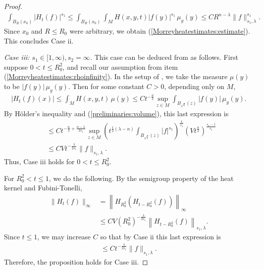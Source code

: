 \documentclass[12pt]{amsart}
\renewcommand{\1}{{\mathbf 1}}
\theoremstyle{others}
\numberwithin{equation}{section}
\begin{document}
\begin{proof}
		\begin{align*}
		\int_{B_R(x_0)} |H_t(f)|^{s_1} \leq \int_{B_R(x_0)} \int_M H(x, y, t) |f(y)|^{s_1} \, \mu_g(y) \leq C R^{n-\lambda} \|f\|_{s_1, \lambda}^{s_1}.
		\end{align*}
		Since \(x_0\) and \(R \leq R_0\) were arbitrary, we obtain (\ref{Morreyheatestimates:estimate}). This concludes Case ii. \par 
        \emph{Case iii: \(s_1 \in [1, \infty), s_2 = \infty\).}
		This case can be deduced from \cite[Lemma 4.2]{semilinearivpriem} as follows. First suppose \(0 < t \leq R_0^2\), and recall our assumption from item (\ref{Morreyheatestimates:rhoinfinity}). In the setup of \cite[Lemma 4.2]{semilinearivpriem}, we take the measure \(\mu(y)\) to be \(|f(y)| \, \mu_g(y)\). Then for some constant \(C > 0\), depending only on \(M\),
        \begin{align*}
            |H_t(f)(x)| \leq \int_M H(x, y, t) \, \mu(y)\leq C t^{-\frac{n}{2}} \sup_{z \in M} \int_{B_{\sqrt{t}}(z)} |f(y)| \, \mu_g(y).
        \end{align*} By H{\"o}lder's inequality and (\ref{preliminaries:volume}), this last expression is
        \begin{align*}
            &\leq C t^{-\frac{n}{2} + \frac{n-\lambda}{2s_1}} \sup_{z \in M} \left(t^{\frac{1}{2}(\lambda-n)}\int_{B_{\sqrt{t}}(z)} |f|^{s_1}\right)^{\frac{1}{s_1}} \left(Vt^{\frac{n}{2}} \right)^{\frac{s_1-1}{s_1}} \\
            &\leq  CV t^{-\frac{\lambda}{2s_1}}\|f\|_{s_1, \lambda}.
        \end{align*} Thus, Case iii holds for \(0 < t \leq R_0^2\). \par
        For \(R_0^2 < t \leq 1\), we do the following. By the semigroup property \cite[(7.51)]{grigoryanheatkernelbook} of the heat kernel and Fubini-Tonelli,
        \begin{align*}
            \|H_t(f)\|_\infty &= \left\|H_{R_0^2}(H_{t - R_0^2}(f))\right\|_\infty \\
            &\leq C V(R_0^2)^{-\frac{\lambda}{2s_1}}\left\|H_{t - R_0^2}(f)\right\|_{s_1, \lambda}.
        \end{align*} Since \(t \leq 1\), we may increase \(C\) so that by Case ii this last expression is 
        \begin{align*}
            \leq C t^{-\frac{\lambda}{2s_1}}\|f\|_{s_1, \lambda}.
        \end{align*} Therefore, the proposition holds for Case iii. \par 

\end{proof}
\end{document}
